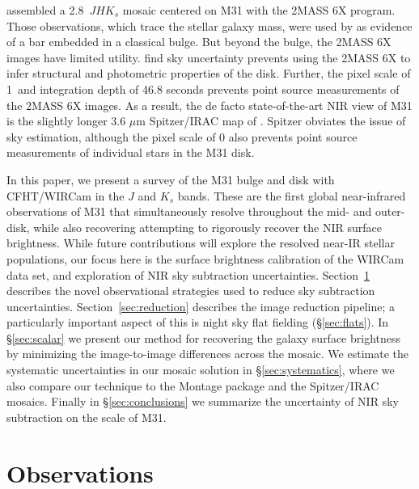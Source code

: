 \documentclass[iop]{emulateapj}
\begin{document}
\cite{Beaton:2007} assembled a 2.8\arcdeg\ $JHK_s$ mosaic centered on M31 with the 2MASS 6X program.
Those observations, which trace the stellar galaxy mass, were used by \cite{Athanassoula:2006} as evidence of a bar embedded in a classical bulge.
But beyond the bulge, the 2MASS 6X images have limited utility.
\cite{Courteau:2011} find sky uncertainty prevents using the 2MASS 6X to infer structural and photometric properties of the disk.
Further, the pixel scale of 1\arcsec\ and integration depth of 46.8 seconds prevents point source measurements of the 2MASS 6X images.
As a result, the de facto state-of-the-art NIR view of M31 is the slightly longer 3.6 $\mu$m Spitzer/IRAC map of \cite{Barmby:2006}.
Spitzer obviates the issue of sky estimation, although the pixel scale of 0 also prevents point source measurements of individual stars in the M31 disk.

In this paper, we present a survey of the M31 bulge and disk with CFHT/WIRCam in the $J$ and $K_s$ bands.
These are the first global near-infrared observations of M31 that simultaneously resolve throughout the mid- and outer-disk, while also recovering attempting to rigorously recover the NIR surface brightness.
While future contributions will explore the resolved near-IR stellar populations, our focus here is the surface brightness calibration of the WIRCam data set, and exploration of NIR sky subtraction uncertainties.
Section~\ref{sec:Observations} describes the novel observational strategies used to reduce sky subtraction uncertainties.
Section~\ref{sec:reduction} describes the image reduction pipeline; a particularly important aspect of this is night sky flat fielding (\S\ref{sec:flats}).
In \S\ref{sec:scalar} we present our method for recovering the galaxy surface brightness by minimizing the image-to-image differences across the mosaic.
We estimate the systematic uncertainties in our mosaic solution in \S\ref{sec:systematics}, where we also compare our technique to the Montage package \citep{Berriman:2008} and the Spitzer/IRAC mosaics.
Finally in \S\ref{sec:conclusions} we summarize the uncertainty of NIR sky subtraction on the scale of M31.

\section{Observations}
\label{sec:Observations}
\end{document}
